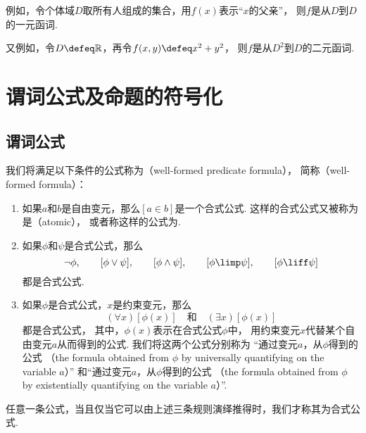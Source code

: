 例如，令个体域\(D\)取所有人组成的集合，用\(f(x)\)表示“\(x\)的父亲”，
则\(f\)是从\(D\)到\(D\)的一元函词.

又例如，令\(D \defeq \mathbb{R}\)，再令\(f(x,y) \defeq x^2 + y^2\)，
则\(f\)是从\(D^2\)到\(D\)的二元函词.

\section{谓词公式及命题的符号化}
\subsection{谓词公式}

我们将满足以下条件的公式称为（well-formed predicate formula），
简称（well-formed formula）：
\begin{enumerate}
	\item 如果\(a\)和\(b\)是自由变元，那么\([a \in b]\)是一个合式公式.
	这样的合式公式又被称为是（atomic），
	或者称这样的公式为.

	\item 如果\(\phi\)和\(\psi\)是合式公式，那么\begin{equation*}
		\neg \phi, \qquad
		[\phi \lor \psi], \qquad
		[\phi \land \psi], \qquad
		[\phi \limp \psi], \qquad
		[\phi \liff \psi]
	\end{equation*}
	都是合式公式.

	\item 如果\(\phi\)是合式公式，\(x\)是约束变元，那么\begin{equation*}
		(\forall x)[\phi(x)]
		\quad\text{和}\quad
		(\exists x)[\phi(x)]
	\end{equation*}
	都是合式公式，
	其中，\(\phi(x)\)表示在合式公式\(\phi\)中，
	用约束变元\(x\)代替某个自由变元\(a\)从而得到的公式.
	我们将这两个公式分别称为
	“通过变元\(a\)，从\(\phi\)得到的公式
	（the formula obtained from \(\phi\) by universally quantifying on the variable \(a\)）”
	和“通过变元\(a\)，从\(\phi\)得到的公式
	（the formula obtained from \(\phi\) by existentially quantifying on the variable \(a\)）”.
\end{enumerate}
任意一条公式，当且仅当它可以由上述三条规则演绎推得时，我们才称其为合式公式.

